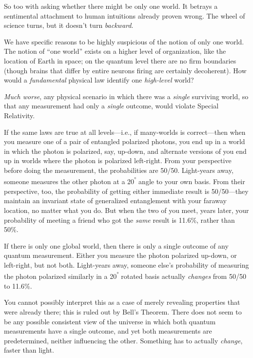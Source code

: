 {
 So too with asking whether there might be only one world. It
betrays a sentimental attachment to human intuitions already proven
wrong. The wheel of science turns, but it doesn't turn
\textit{backward}.}

{
 We have specific reasons to be highly suspicious of the notion of
only one world. The notion of ``one
world'' exists on a higher level of organization,
like the location of Earth in space; on the quantum level there are no
firm boundaries (though brains that differ by entire neurons firing are
certainly decoherent). How would a \textit{fundamental} physical law
identify one \textit{high-level} world?}

{
 \textit{Much worse}, any physical scenario in which there was a
\textit{single} surviving world, so that any measurement had only a
\textit{single} outcome, would violate Special Relativity.}

{
 If the same laws are true at all levels---i.e., if many-worlds is
correct---then when you measure one of a pair of entangled polarized
photons, you end up in a world in which the photon is polarized, say,
up-down, and alternate versions of you end up in worlds where the
photon is polarized left-right. From your perspective before doing the
measurement, the probabilities are 50/50. Light-years away, someone
measures the other photon at a 20\textsuperscript{°} angle to your own
basis. From their perspective, too, the probability of getting either
immediate result is 50/50---they maintain an invariant state of
generalized entanglement with your faraway location, no matter what you
do. But when the two of you meet, years later, your probability of
meeting a friend who got the \textit{same} result is 11.6\%, rather
than 50\%.}

{
 If there is only one global world, then there is only a single
outcome of any quantum measurement. Either you measure the photon
polarized up-down, or left-right, but not both. Light-years away,
someone else's probability of measuring the photon
polarized similarly in a 20\textsuperscript{°} rotated basis actually
\textit{changes} from 50/50 to 11.6\%.}

{
 You cannot possibly interpret this as a case of merely revealing
properties that were already there; this is ruled out by
Bell's Theorem. There does not seem to be any possible
consistent view of the universe in which both quantum measurements have
a single outcome, and yet both measurements are predetermined, neither
influencing the other. Something has to actually \textit{change},
faster than light.}

